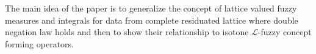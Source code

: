 \newcommand{\LL}{{\mathcal L}}

The main idea of the paper is to generalize the concept of lattice valued fuzzy measures and integrals for data from complete residuated lattice where double negation law holds and then to show their relationship to isotone $\LL$-fuzzy concept forming operators.

